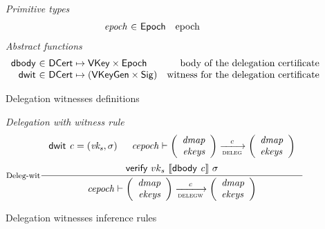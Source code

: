 \documentclass[11pt,a4paper]{article}
\newcommand{\var}[1]{\mathit{#1}}
\newcommand{\fun}[1]{\mathsf{#1}}
\newcommand{\type}[1]{\mathsf{#1}}
\newcommand{\trans}[2]{\xlongrightarrow[\textsc{#1}]{#2}}
\newcommand{\VKey}{\type{VKey}}
\newcommand{\Sig}{\type{Sig}}
\newcommand{\DCert}{\type{DCert}}
\newcommand{\Epoch}{\type{Epoch}}
\newcommand{\VKeyGen}{\type{VKeyGen}}
\newcommand{\verify}[3]{\fun{verify} ~ #1 ~ #2 ~ #3}
\newcommand{\serialised}[1]{\llbracket \var{#1} \rrbracket}
\newcommand{\dbody}[1]{\fun{dbody}~\var{#1}}
\newcommand{\dwit}[1]{\fun{dwit}~\var{#1}}
\begin{document}
\begin{figure}
  \emph{Primitive types}
  \begin{equation*}
    \begin{array}{r@{~\in~}lr}
      \var{epoch} & \Epoch & \text{epoch}
    \end{array}
  \end{equation*}
  \emph{Abstract functions}
  \begin{equation*}
    \begin{array}{r@{~\in~}lr}
      \fun{dbody} & \DCert \mapsto \VKey \times \Epoch
      & \text{body of the delegation certificate}\\
      \fun{dwit} & \DCert \mapsto (\VKeyGen \times \Sig)
      & \text{witness for the delegation certificate}
    \end{array}
  \end{equation*}
  \caption{Delegation witnesses definitions}
  \label{fig:delegation-witnesses-defs}
\end{figure}

\begin{figure}
  \emph{Delegation with witness rule}
  \begin{equation}
    \label{eq:deleg-witnesses}
    \inference[Deleg-wit]
    { \dwit{c} = (\var{vk_s}, \sigma)
      & \var{cepoch} \vdash
      {\left(
        \begin{array}{r}
          \var{dmap}\\
          \var{ekeys}
        \end{array}
      \right)}
      \trans{deleg}{c}
      {\left(
      \begin{array}{l}
          \var{dmap}\\
          \var{ekeys}
      \end{array}
      \right)}
      \\ ~ \\
      \verify{vk_s}{\serialised{\dbody{c}}}{\sigma}
    }
    {\var{cepoch} \vdash
      {\left(
        \begin{array}{r}
          \var{dmap}\\
          \var{ekeys}
        \end{array}
      \right)}
      \trans{delegw}{c}
      {\left(
      \begin{array}{l}
          \var{dmap}\\
          \var{ekeys}
      \end{array}
      \right)}}
  \end{equation}
  \caption{Delegation witnesses inference rules}
  \label{fig:deleg-witnesses}
\end{figure}
\end{document}
